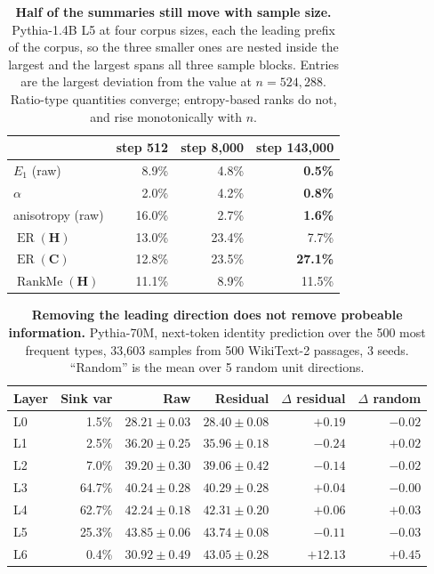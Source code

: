 \documentclass{article}
\theoremstyle{spaced}
\theoremstyle{definition}
\DeclareMathOperator{\ER}{ER}
\DeclareMathOperator{\RankMe}{RankMe}
\newcommand{\bH}{\mathbf{H}}
\newcommand{\bC}{\mathbf{C}}
\begin{document}
\begin{table}[t]
\centering
\caption{\textbf{Half of the summaries still move with sample size.} Pythia-1.4B L5 at four corpus sizes, each the leading prefix of the corpus, so the three smaller ones are nested inside the largest and the largest spans all three sample blocks. Entries are the largest deviation from the value at $n = 524{,}288$. Ratio-type quantities converge; entropy-based ranks do not, and rise monotonically with $n$.}
\label{tab:nsweep}
\small
\begin{tabular}{@{}lrrr@{}}
\toprule
& \textbf{step 512} & \textbf{step 8{,}000} & \textbf{step 143{,}000} \\
\midrule
$E_1$ (raw)            & 8.9\%  & 4.8\%  & \textbf{0.5\%} \\
$\alpha$               & 2.0\%  & 4.2\%  & \textbf{0.8\%} \\
anisotropy (raw)       & 16.0\% & 2.7\%  & \textbf{1.6\%} \\
\midrule
$\ER(\bH)$             & 13.0\% & 23.4\% & 7.7\% \\
$\ER(\bC)$             & 12.8\% & 23.5\% & \textbf{27.1\%} \\
$\RankMe(\bH)$         & 11.1\% & 8.9\%  & 11.5\% \\
\bottomrule
\end{tabular}
\end{table}

\begin{table}[t]
\centering
\caption{\textbf{Removing the leading direction does not remove probeable information.} Pythia-70M, next-token identity prediction over the 500 most frequent types, 33{,}603 samples from 500 WikiText-2 passages, 3 seeds. ``Random'' is the mean over 5 random unit directions.}
\label{tab:probe}
\small
\begin{tabular}{@{}lrrrrr@{}}
\toprule
\textbf{Layer} & \textbf{Sink var} & \textbf{Raw} & \textbf{Residual} & $\Delta$ \textbf{residual} & $\Delta$ \textbf{random} \\
\midrule
L0 & 1.5\%  & $28.21 \pm 0.03$ & $28.40 \pm 0.08$ & $+0.19$ & $-0.02$ \\
L1 & 2.5\%  & $36.20 \pm 0.25$ & $35.96 \pm 0.18$ & $-0.24$ & $+0.02$ \\
L2 & 7.0\%  & $39.20 \pm 0.30$ & $39.06 \pm 0.42$ & $-0.14$ & $-0.02$ \\
L3 & 64.7\% & $40.24 \pm 0.28$ & $40.29 \pm 0.28$ & $+0.04$ & $-0.00$ \\
L4 & 62.7\% & $42.24 \pm 0.18$ & $42.31 \pm 0.20$ & $+0.06$ & $+0.03$ \\
L5 & 25.3\% & $43.85 \pm 0.06$ & $43.74 \pm 0.08$ & $-0.11$ & $-0.03$ \\
L6 & 0.4\%  & $30.92 \pm 0.49$ & $43.05 \pm 0.28$ & $\mathbf{+12.13}$ & $+0.45$ \\
\bottomrule
\end{tabular}
\end{table}
\end{document}
